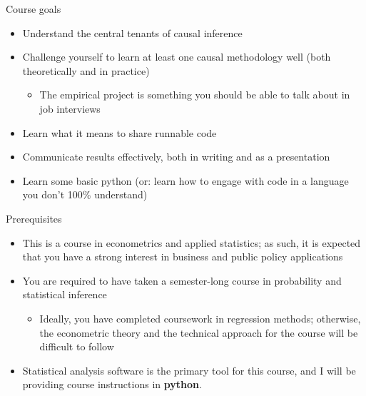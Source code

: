 \documentclass[compress, 8pt]{beamer}
\begin{document}
\begin{frame}{Course goals}

\begin{itemize}
    \item Understand the central tenants of causal inference
    \item Challenge yourself to learn at least one causal methodology well (both theoretically and in practice)
    \begin{itemize}
        \item The empirical project is something you should be able to talk about in job interviews
    \end{itemize}
    \item Learn what it means to share runnable code
    \item Communicate results effectively, both in writing and as a presentation
    \item Learn some basic python (or: learn how to engage with code in a language you don't 100\% understand)
\end{itemize}


\end{frame}

\begin{frame}{Prerequisites}

\begin{itemize}

    \item This is a course in econometrics and applied statistics; as such, it is expected that you have a strong interest in business and public policy applications


\vspace{1em}
\item You are required to have taken a semester-long course in probability and statistical inference 

\begin{itemize}
    \item Ideally, you have completed coursework in regression methods; otherwise, the econometric theory and the technical approach for the course will be difficult to follow
\end{itemize}

\pause
\vspace{1em}
\item Statistical analysis software is the primary tool for this course, and I will be providing course instructions in \textbf{python}. 

\end{itemize}

\end{frame}
\end{document}
